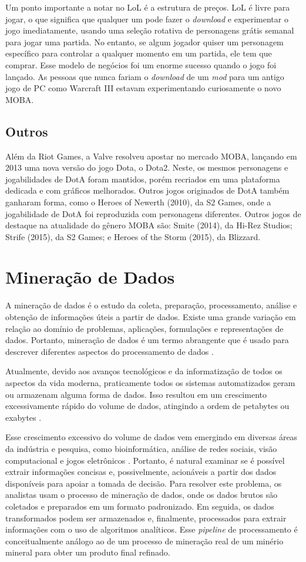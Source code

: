 Um ponto importante a notar no LoL é a estrutura de preços. LoL é livre para jogar, o que significa que qualquer um pode fazer o \textit{download} e experimentar o jogo imediatamente, usando uma seleção rotativa de personagens grátis semanal para jogar uma partida. No entanto, se algum jogador quiser um personagem específico para controlar a qualquer momento em um partida, ele tem que comprar. Esse modelo de negócios foi um enorme sucesso quando o jogo foi lançado. As pessoas que nunca fariam o \textit{download} de um \textit{mod} para um antigo jogo de PC como Warcraft III estavam experimentando curiosamente o novo MOBA.

\subsection{Outros}
Além da Riot Games, a Valve resolveu apostar no mercado MOBA, lançando em 2013 uma nova versão do jogo Dota, o Dota2. Neste, os mesmos personagens e jogabilidades de DotA foram mantidos, porém recriados em uma plataforma dedicada e com gráficos melhorados. Outros jogos originados de DotA também ganharam forma, como o Heroes of Newerth (2010), da S2 Games, onde a jogabilidade de DotA foi reproduzida com personagens diferentes. Outros jogos de destaque na atualidade do gênero MOBA são: Smite (2014), da Hi-Rez Studios; Strife (2015), da S2 Games; e Heroes of the Storm (2015), da Blizzard.

\section{Mineração de Dados}
A mineração de dados é o estudo da coleta, preparação, processamento, análise e obtenção de informações úteis a partir de dados. Existe uma grande variação em relação ao domínio de problemas, aplicações, formulações e representações de dados. Portanto, mineração de dados é um termo abrangente que é usado para descrever diferentes aspectos do processamento de dados \cite{aggarwal2015data}.

Atualmente, devido aos avanços tecnológicos e da informatização de todos os aspectos da vida moderna, praticamente todos os sistemas automatizados geram ou armazenam alguma forma de dados. Isso resultou em um crescimento excessivamente rápido do volume de dados, atingindo a ordem de petabytes ou exabytes \cite{aggarwal2015data}.

Esse crescimento excessivo do volume de dados vem emergindo em diversas áreas da indústria e pesquisa, como bioinformática, análise de redes sociais, visão computacional e jogos eletrônicos \cite{el2016game}. Portanto, é natural examinar se é possível extrair informações concisas e, possivelmente, acionáveis a partir dos dados disponíveis para apoiar a tomada de decisão. Para resolver este problema, os analistas usam o processo de mineração de dados, onde os dados brutos são coletados e preparados em um formato padronizado. Em seguida, os dados transformados podem ser armazenados e, finalmente, processados para extrair informações com o uso de algoritmos analíticos. Esse \textit{pipeline} de processamento é conceitualmente análogo ao de um processo de mineração real de um minério mineral para obter um produto final refinado. 


